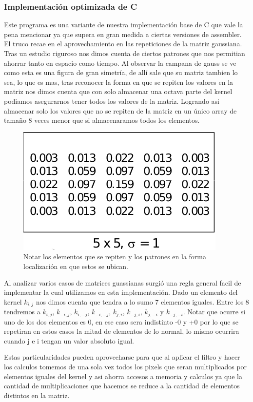 \subsubsection{Implementación optimizada de C}

Este programa es una variante de nuestra implementación base de C que vale la pena mencionar ya que supera en gran medida a ciertas versiones de assembler. El truco recae en el aprovechamiento en las repeticiones de la matriz gaussiana. Tras un estudio riguroso nos dimos cuenta de ciertos patrones que nos permitian ahorrar tanto en espacio como tiempo. Al observar la campana de gauss se ve como esta es una figura de gran simetría, de allí sale que su matriz tambien lo sea, lo que es mas, tras reconocer la forma en que se repiten los valores en la matriz nos dimos cuenta que con solo almacenar una octava parte del kernel podiamos asegurarnos tener todos los valores de la matriz. Logrando asi almacenar solo los valores que no se repiten de la matriz en un único array de tamaño 8 veces menor que si almacenaramos todos los elementos.


\begin{figure}[H]
 	\centering
 	\includegraphics[scale=0.5]{./imgs/gaussian_kernel.png}
	\caption{\footnotesize Notar los elementos que se repiten y los patrones en la forma localización en que estos se ubican.}
	\label{fig:lineplot.diff}
\end{figure}


Al analizar varios casos de matrices guassianas surgió una regla general facil de implementar la cual utilizamos en esta implementación. Dado un elemento del kernel $k_{i,j}$ nos dimos cuenta que tendra a lo sumo 7 elementos iguales. Entre los 8 tendremos a $k_{i,j}$, $k_{-i,j}$, $k_{i,-j}$, $k_{-i,-j}$, $k_{j,i}$, $k_{-j,i}$, $k_{j,-i}$ y $k_{-j,-i}$. Notar que ocurre si uno de los dos elementos es 0, en ese caso sera indistinto -0 y +0 por lo que se repetiran en estos casos la mitad de elementos de lo normal, lo mismo ocurrira cuando j e i tengan un valor absoluto igual.

Estas particularidades pueden aprovecharse para que al aplicar el filtro y hacer los calculos tomemos de una sola vez todos los pixels que seran multiplicados por elementos iguales del kernel y asi ahorra accesos a memoria y calculos ya que la cantidad de multiplicaciones que hacemos se reduce a la cantidad de elementos distintos en la matriz.
